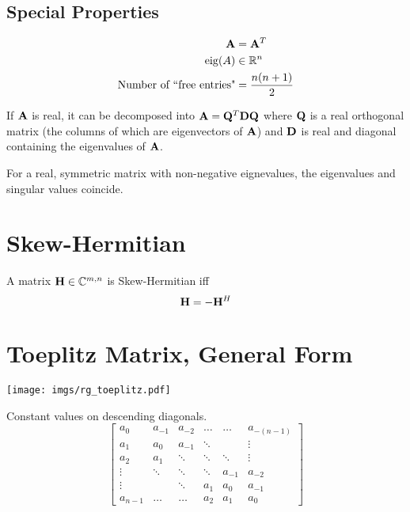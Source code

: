 \subsection*{Special Properties}

\begin{align}
\mathbf{A}                                &=   \mathbf{A}^T \\
\operatorname{eig}(A)                            &\in \mathbb{R}^{n}  \\
\textrm{Number of ``free entries"} &=    \frac{n(n+1)}{2}
\end{align}

If $\mathbf{A}$ is real, it can be decomposed into $\mathbf{A}=\mathbf{Q}^T\mathbf{D}\mathbf{Q}$ where $\mathbf{Q}$ is a real orthogonal matrix (the columns of which are eigenvectors of $\mathbf{A}$) and $\mathbf{D}$ is real and diagonal containing the eigenvalues of $\mathbf{A}$.

For a real, symmetric matrix with non-negative eignevalues, the eigenvalues and singular values coincide.



\section{Skew-Hermitian}
A matrix $\mathbf{H}\in\mathbb{C}^{m,n}$ is Skew-Hermitian iff
\begin{equation}
\mathbf{H}=-\mathbf{H}^H
\end{equation}



\section{Toeplitz Matrix, General Form}

\begin{center}
\texttt{[image: imgs/rg\_toeplitz.pdf]}
\end{center}
Constant values on descending diagonals.
\begin{equation}
\begin{bmatrix}
  a_{0} & a_{-1} & a_{-2} & \ldots  & \ldots & a_{-(n-1)}  \\
  a_{1} & a_0    & a_{-1} & \ddots  &        & \vdots \\
  a_{2} & a_{1}  & \ddots & \ddots  & \ddots & \vdots \\
 \vdots & \ddots & \ddots & \ddots  & a_{-1} & a_{-2}\\
 \vdots &        & \ddots & a_{1}   & a_{0}  & a_{-1} \\
a_{n-1} & \ldots & \ldots & a_{2}   & a_{1}  & a_{0}
\end{bmatrix}
\end{equation}


